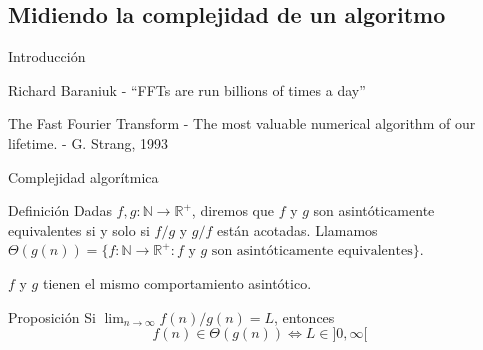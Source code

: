 \documentclass[11pt,compress]{beamer}
\newcommand\R{\mathbb{R}}
\newcommand\N{\mathbb{N}}
\begin{document}
\subsection{Midiendo la complejidad de un algoritmo}

\begin{frame}{Introducción}
    \begin{tcolorbox}[colback=ChetwodeBlue!10,colframe=ChetwodeBlue!60]
  \begin{center}
    {\color{TurkishRose}Richard Baraniuk - ``FFTs are run billions of times a day''}
  \end{center}

  \end{tcolorbox}
    
  \begin{tcolorbox}[colback=ChetwodeBlue!10,colframe=ChetwodeBlue!60]
  \begin{center}
    {\color{TurkishRose}The Fast Fourier Transform - The most valuable numerical algorithm of our lifetime. - G. Strang, 1993}
  \end{center}
  \end{tcolorbox}
  
  
    
\end{frame}

\begin{frame}{Complejidad algorítmica}

    \begin{block}{Definición}
        Dadas $f,g \colon \N \to \R^+$, diremos que $f$ y $g$ son asintóticamente equivalentes si y solo si $f/g$ y $g/f$ están acotadas. Llamamos $\Theta(g(n)) = \{ f \colon \N \to \R^+ \colon f \text{ y } g \text{ son asintóticamente equivalentes}\}$.
    \end{block}
    
    $f$ y $g$ tienen el mismo comportamiento asintótico.

    \begin{alertblock}{Proposición}
       Si $\lim_{n\to\infty}f(n)/g(n) = L$, entonces
      \[ f(n) \in \Theta(g(n)) \iff L \in ]0,\infty[ \]
    \end{alertblock}
    
\end{frame}
\end{document}

